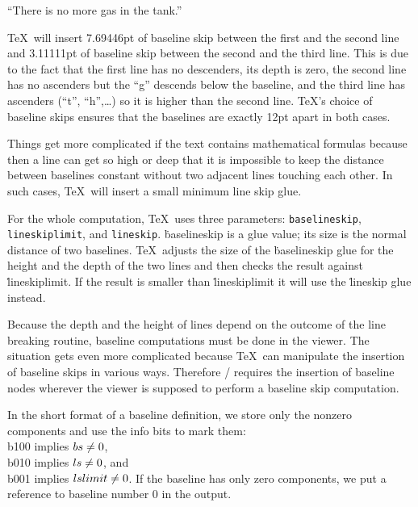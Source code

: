 \qquad\vbox{\hsize\noindent
``There is no\hfil\break
more gas\hfil\break
in the tank.''
}\hss

\medskip\noindent
\TeX\ will insert 7.69446pt of baseline skip between the first and the second line and
3.11111pt of baseline skip between the second and the third line. This is due to the
fact that the first line has no descenders, its depth is zero, the second line
has no ascenders but the ``g'' descends below the baseline, and the third line
has ascenders (``t'', ``h'',\dots) so it is higher than the second line.
\TeX's choice of baseline skips ensures that the baselines are exactly 12pt apart
in both cases.

Things get more complicated if the text contains mathematical formulas because then
a line can get so high or deep that it is impossible to keep the distance between
baselines constant without two adjacent lines touching each other. In such cases,
\TeX\ will insert a small minimum line skip glue.

For the whole computation, \TeX\ uses three parameters: {\tt baselineskip},
{\tt line\-skip\-limit}, and {\tt lineskip}.
\.{baselineskip} is a glue value; its size is the normal distance of two baselines.
\TeX\ adjusts the size of the \.{baselineskip} glue for the height and the depth of
the two lines and then checks the result against \.{lineskiplimit}.
If the result is smaller than \.{lineskiplimit} it will use the \.{lineskip} glue
instead.

Because the depth and the height of lines depend on the outcome of the line breaking
routine, baseline computations must be done in the viewer.
The situation gets even more complicated because \TeX\ can manipulate the insertion
of baseline skips in various ways. Therefore \HINT/ requires the insertion of
baseline nodes wherever the viewer is supposed to perform a baseline skip
computation.

In the short format of a baseline definition, we store only the nonzero components and use the
info bits to mark them: \\{b100} implies $\\{bs}\ne0$,
\\{b010} implies $\\{ls}\ne 0$, and \\{b001} implies  $\index{lslimit+\\{lslimit}}\\{lslimit}\ne 0$.
If the baseline has only zero components, we put a reference to baseline number 0
in the output.

